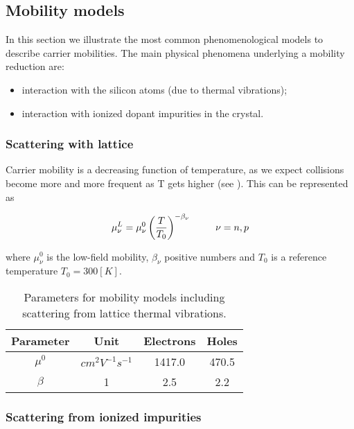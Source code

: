 \subsection{Mobility models}

In this section we illustrate the most common phenomenological models to describe carrier mobilities. The main physical phenomena underlying a mobility reduction are:

\begin{itemize}
\item interaction with the silicon atoms (due to thermal vibrations);
\item interaction with ionized dopant impurities in the crystal.
\end{itemize}

\subsubsection{Scattering with lattice}

Carrier mobility is a decreasing function of temperature, as we expect collisions become more and more frequent as T gets higher (see \cite{Lombardi:MobConst}). This can be represented as

\begin{equation}
\label{eq: mobility thermal}
\mu_\nu^L = \mu_\nu^0\left( \dfrac{T}{T_0}\right)^{-\beta_\nu} \psp{15} \nu = n,p
\end{equation}

where $\mu_\nu^0$ is the low-field mobility, $\beta_\nu$ positive numbers and $T_0$ is a reference temperature $T_0=300[K]$.

\begin{table}[!h]
\centering
\begin{tabular}{cccc}
\toprule
Parameter & Unit & Electrons & Holes \\
\midrule
$\mu^0$ & $cm^2V^{-1}s^{-1}$ & 1417.0 & 470.5\\
$\beta$ & 1 & 2.5 & 2.2\\
\bottomrule
\end{tabular}
\caption{Parameters for mobility models including scattering from lattice thermal vibrations.}
\end{table}

\subsubsection{Scattering from ionized impurities}
\label{sec: Masetti model}

